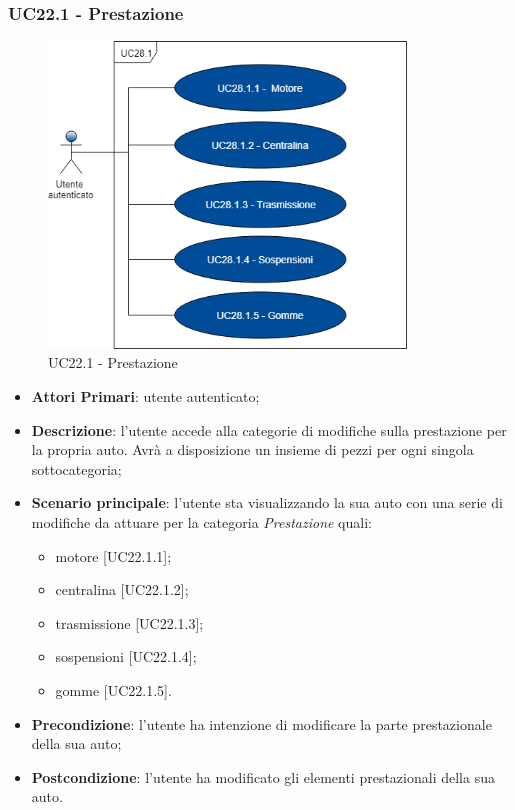\subsubsection{UC22.1 - Prestazione}
\begin{figure}[h]
	\includegraphics[width=9.5cm]{res/images/UC26-1Prestazioni.png}
	\centering
	\caption{UC22.1 - Prestazione}
\end{figure}
\begin{itemize}
	\item \textbf{Attori Primari}: utente autenticato;
	\item \textbf{Descrizione}: l'utente accede alla categorie di modifiche sulla prestazione per la propria auto. Avrà a disposizione un insieme di pezzi per ogni singola sottocategoria;
	\item \textbf{Scenario principale}: l'utente sta visualizzando la sua auto con una serie di modifiche da attuare per la categoria \textit{Prestazione} quali:
	\begin{itemize}
		\item motore [UC22.1.1];
		\item centralina [UC22.1.2];
		\item trasmissione [UC22.1.3];
		\item sospensioni [UC22.1.4];
		\item gomme [UC22.1.5].
	\end{itemize}
	\item \textbf{Precondizione}: l'utente ha intenzione di modificare la parte prestazionale della sua auto;
	\item \textbf{Postcondizione}: l'utente ha modificato gli elementi prestazionali della sua auto.
\end{itemize}
